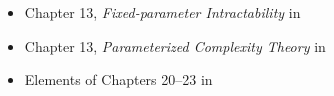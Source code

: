 \begin{frame}

  \begin{itemize}
   
   \item Chapter 13, \emph{Fixed-parameter Intractability} in \cite{CyganFKL+15}
   \item Chapter 13, \emph{Parameterized Complexity Theory} in \cite{Niedermeier06}
   \item Elements of Chapters 20--23 in \cite{DowneyF13}
  \end{itemize}

\end{frame}

\begin{frame}[t, allowframebreaks]
\printbibliography
\end{frame}




